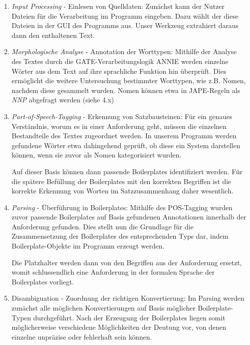 \documentclass[12pt]{report}
\begin{document}
\begin{enumerate}
\item \textit{Input Processing} - Einlesen von Quelldaten: Zunächst kann der Nutzer Dateien für die Verarbeitung im Programm eingeben. Dazu wählt der diese Dateien in der GUI des Programms aus. Unser Werkzeug extrahiert daraus dann den enthaltenen Text.

\item \textit{Morphologische Analyse} - Annotation der Worttypen: Mithilfe der Analyse des Textes durch die GATE-Verarbeitungslogik ANNIE werden einzelne Wörter aus dem Text auf ihre sprachliche Funktion hin überprüft. Dies ermöglicht die weitere Untersuchung bestimmter Worttypen, wie z.B. Nomen, nachdem diese gesammelt wurden. Nomen können etwa in JAPE-Regeln als \textit{NNP} abgefragt werden (siehe 4.x)

\item \textit{Part-of-Speech-Tagging} - Erkennung von Satzbausteinen: Für ein genaues Verständnis, worum es in einer Anforderung geht, müssen die einzelnen Bestandteile des Textes zugeordnet werden. In unserem Programm werden gefundene Wörter etwa dahingehend geprüft, ob diese ein System darstellen können, wenn sie zuvor als Nomen kategorisiert wurden. 

Auf dieser Basis können dann passende Boilerplates identifiziert werden. Für die spätere Befüllung der Boilerplates mit den korrekten Begriffen ist die korrekte Erkennung von Worten im Satzzusammenhang daher wesentlich.

\item \textit{Parsing} - Überführung in Boilerplates: Mithilfe des POS-Tagging wurden zuvor passende Boilerplates auf Basis gefundenen Annotationen innerhalb der Anforderung gefunden. Dies stellt nun die Grundlage für die Zusammensetzung der Boilerplates des entsprechenden Typs dar, indem Boilerplate-Objekte im Programm erzeugt werden. 

Die Platzhalter werden dann von den Begriffen aus der Anforderung ersetzt, womit schlussendlich eine Anforderung in der formalen Sprache der Boilerplates vorliegt.

\item{Disambiguation} - Zuordnung der richtigen Konvertierung: Im Parsing werden zunächst alle möglichen Konvertierungen auf Basis möglicher Boilerplate-Typen durchgeführt. Nach der Erzeugung der Boilerplates liegen somit möglicherweise verschiedene Möglichkeiten der Deutung vor, von denen einzelne unpräzise oder fehlerhaft sein können. 


\end{enumerate}
\end{document}

